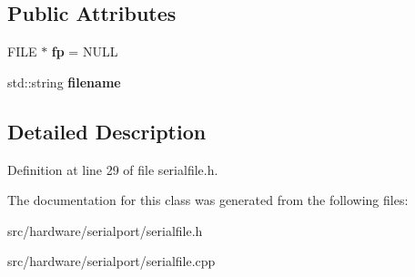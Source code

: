 \subsection*{Public Attributes}
\begin{DoxyCompactItemize}
\item 
\hypertarget{classCSerialFile_a5a5c9fbee8fca0189fd6316505c542cd}{F\-I\-L\-E $\ast$ {\bfseries fp} = N\-U\-L\-L}\label{classCSerialFile_a5a5c9fbee8fca0189fd6316505c542cd}

\item 
\hypertarget{classCSerialFile_a28604052c9fdf81249c8473c782a09a6}{std\-::string {\bfseries filename}}\label{classCSerialFile_a28604052c9fdf81249c8473c782a09a6}

\end{DoxyCompactItemize}


\subsection{Detailed Description}


Definition at line 29 of file serialfile.\-h.



The documentation for this class was generated from the following files\-:\begin{DoxyCompactItemize}
\item 
src/hardware/serialport/serialfile.\-h\item 
src/hardware/serialport/serialfile.\-cpp\end{DoxyCompactItemize}
